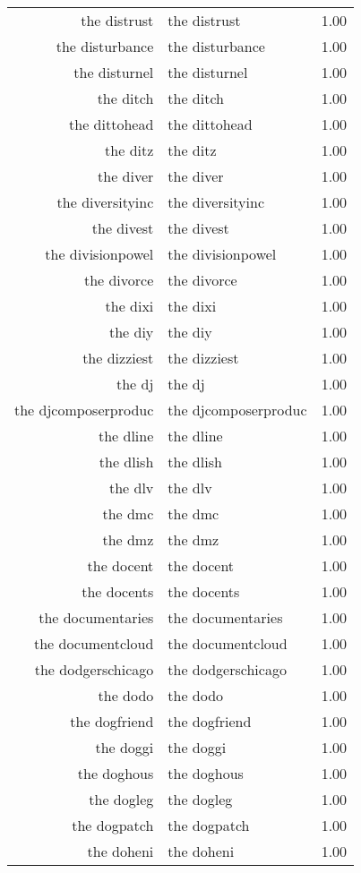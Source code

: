 \begin{table}[ht]
\begin{tabular}{rlr}
  the distrust & the distrust & 1.00 \\ 
  the disturbance & the disturbance & 1.00 \\ 
  the disturnel & the disturnel & 1.00 \\ 
  the ditch & the ditch & 1.00 \\ 
  the dittohead & the dittohead & 1.00 \\ 
  the ditz & the ditz & 1.00 \\ 
  the diver & the diver & 1.00 \\ 
  the diversityinc & the diversityinc & 1.00 \\ 
  the divest & the divest & 1.00 \\ 
  the divisionpowel & the divisionpowel & 1.00 \\ 
  the divorce & the divorce & 1.00 \\ 
  the dixi & the dixi & 1.00 \\ 
  the diy & the diy & 1.00 \\ 
  the dizziest & the dizziest & 1.00 \\ 
  the dj & the dj & 1.00 \\ 
  the djcomposerproduc & the djcomposerproduc & 1.00 \\ 
  the dline & the dline & 1.00 \\ 
  the dlish & the dlish & 1.00 \\ 
  the dlv & the dlv & 1.00 \\ 
  the dmc & the dmc & 1.00 \\ 
  the dmz & the dmz & 1.00 \\ 
  the docent & the docent & 1.00 \\ 
  the docents & the docents & 1.00 \\ 
  the documentaries & the documentaries & 1.00 \\ 
  the documentcloud & the documentcloud & 1.00 \\ 
  the dodgerschicago & the dodgerschicago & 1.00 \\ 
  the dodo & the dodo & 1.00 \\ 
  the dogfriend & the dogfriend & 1.00 \\ 
  the doggi & the doggi & 1.00 \\ 
  the doghous & the doghous & 1.00 \\ 
  the dogleg & the dogleg & 1.00 \\ 
  the dogpatch & the dogpatch & 1.00 \\ 
  the doheni & the doheni & 1.00 \\ 

\end{tabular}
\end{table}

